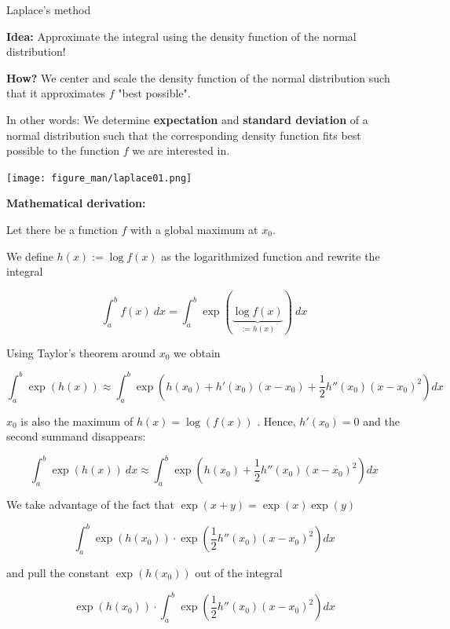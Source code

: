 \documentclass[11pt,compress,t,notes=noshow, xcolor=table]{beamer}
\begin{document}
\begin{vbframe}{Laplace's method}
\lz

\textbf{Idea:} Approximate the integral using the density function of the normal distribution!

\lz

\textbf{How?} We center and scale the density function of the normal distribution such that it approximates $f$ "best possible".

\framebreak

In other words: We determine \textbf{expectation} and \textbf{standard deviation} of a normal distribution such that the corresponding density function fits best possible to the function $f$ we are interested in.

\begin{center}
\texttt{[image: figure\_man/laplace01.png]}
\end{center}


\framebreak

\textbf{Mathematical derivation:}

Let there be a function $f$ with a global maximum at $x_0$.

\lz

We define $h(x) := \log f(x)$ as the logarithmized function and rewrite the integral

$$
\int_a^b f(x)~dx = \int_a^b \exp(\underbrace{\log f(x)}_{:=h(x)})~dx
$$

Using Taylor's theorem around $x_0$ we obtain

\small
$$
\int_a^b \exp\left(h(x)\right) \approx \int_a^b \exp\left( h(x_0) + h'(x_0)(x - x_0) + \frac{1}{2} h''(x_0)(x - x_0)^2\right) dx
$$
\normalsize

\framebreak

$x_0$ is also the maximum of $h(x) = \log(f(x))$ . Hence, $h'(x_0) = 0$ and the second summand disappears:

$$
\int_a^b \exp\left(h(x)\right)~dx \approx \int_a^b \exp\left( h(x_0) + \frac{1}{2} h''(x_0)(x - x_0)^2\right) dx
$$

We take advantage of the fact that $\exp(x + y) = \exp(x)\exp(y)$

$$
\int_a^b \exp\left( h(x_0)\right) \cdot \exp\left(\frac{1}{2} h''(x_0)(x - x_0)^2\right) dx
$$

and pull the constant $\exp\left( h(x_0)\right)$ out of the integral

$$
\exp\left( h(x_0)\right) \cdot\int_a^b \exp\left(\frac{1}{2} h''(x_0)(x - x_0)^2\right) dx
$$

\framebreak


\end{vbframe}
\end{document}
